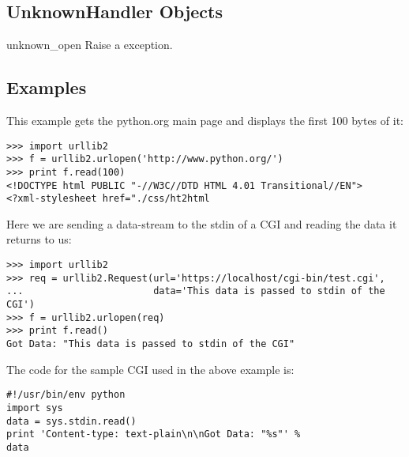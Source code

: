 

\subsection{UnknownHandler Objects \label{unknown-handler-objects}}

\begin{methoddesc}[UnknownHandler]{unknown_open}{}
Raise a  exception.
\end{methoddesc}


\subsection{Examples \label{urllib2-examples}}

This example gets the python.org main page and displays the first 100
bytes of it:

\begin{verbatim}
>>> import urllib2
>>> f = urllib2.urlopen('http://www.python.org/')
>>> print f.read(100)
<!DOCTYPE html PUBLIC "-//W3C//DTD HTML 4.01 Transitional//EN">
<?xml-stylesheet href="./css/ht2html
\end{verbatim}

Here we are sending a data-stream to the stdin of a CGI and reading
the data it returns to us:

\begin{verbatim}
>>> import urllib2
>>> req = urllib2.Request(url='https://localhost/cgi-bin/test.cgi',
...                       data='This data is passed to stdin of the CGI')
>>> f = urllib2.urlopen(req)
>>> print f.read()
Got Data: "This data is passed to stdin of the CGI"
\end{verbatim}

The code for the sample CGI used in the above example is:

\begin{verbatim}
#!/usr/bin/env python
import sys
data = sys.stdin.read()
print 'Content-type: text-plain\n\nGot Data: "%s"' %
data
\end{verbatim}
